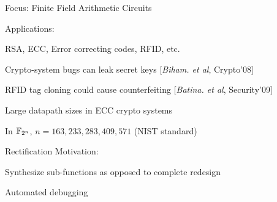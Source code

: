 


\begin{frame}{\large Focus: Finite Field Arithmetic Circuits}
\bi
	\item Applications:
	\bi
		\item RSA, ECC, Error correcting codes, RFID, etc.
		\bi
			\item Crypto-system bugs can leak secret keys [{\it Biham. et al}, Crypto'08]
			\item RFID tag cloning could cause counterfeiting [{\it Batina. et al}, Security'09]
		\ei
		\item Large datapath sizes in ECC crypto systems 
		\bi
			\item In ${\mathbb{F}}_{2^n}$, $n=163, 233, 283, 409, 571$ (NIST standard)
		\ei
	\ei
	\vspace{0.1in}
	\item Rectification Motivation: 
	\bi
		\item Synthesize sub-functions as opposed to complete redesign
		\item Automated debugging
	\ei
\ei
\end{frame}

